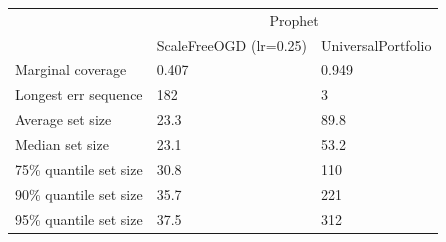 \begin{tabular}{lll}
\toprule
& \multicolumn{2}{c}{Prophet} \\
& ScaleFreeOGD (lr=0.25) & UniversalPortfolio \\
\midrule
Marginal coverage & 0.407 & 0.949 \\
Longest err sequence & 182 & 3 \\
Average set size & 23.3 & 89.8 \\
Median set size & 23.1 & 53.2 \\
75\% quantile set size & 30.8 & 110 \\
90\% quantile set size & 35.7 & 221 \\
95\% quantile set size & 37.5 & 312 \\
\bottomrule
\end{tabular}
